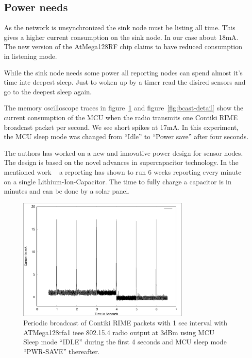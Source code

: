 \documentclass[conference, a4paper,10pt,twocolumn]{IEEEtran}
\begin{document}
\subsection{Power needs}

As the network is unsynchronized the sink node must be listing
all time. This gives a higher current consumption on the sink node. 
In our case about 18mA. The new version of the AtMega128RF chip 
claims to have reduced consumption in listening mode. ~\cite{ATMEGA}

While the sink node needs some power all reporting nodes 
can spend almost it's time inte deepest sleep. Just to woken 
up by a timer read the disired sensors and go to the deepest 
sleep again. 

The memory oscilloscope traces in figure~\ref{fig:bcast} 
and figure~\ref{fig:bcast-detail} show the current consumption 
of the MCU when the radio transmits one Contiki RIME~\cite{RIME} 
broadcast packet per second. 
We see short spikes at 17mA. In this experiment, the MCU sleep 
mode was changed from ``Idle'' to ``Power save'' after four seconds.

The authors has worked on a new and innovative power design 
for sensor nodes. The design is based on the novel advances 
in supercapacitor technology. In the mentioned work ~\cite{LICCAP}  
a reporting has shown to run 6 weeks reporting every minute
on a single Lithium-Ion-Capacitor. The time to fully charge 
a capacitor is in minutes and can be done by a solar panel.

\begin{figure}
\centering
    \includegraphics[width=3.4in]{bcast.eps}
    \caption{Periodic broadcast of Contiki RIME packets with 1 sec interval with ATMega128rfa1 ieee 802.15.4 radio output at 3dBm using MCU Sleep mode “IDLE” during the first 4 seconds and MCU sleep mode “PWR-SAVE” thereafter.}
    \label{fig:bcast}
\end{figure}
\end{document}
